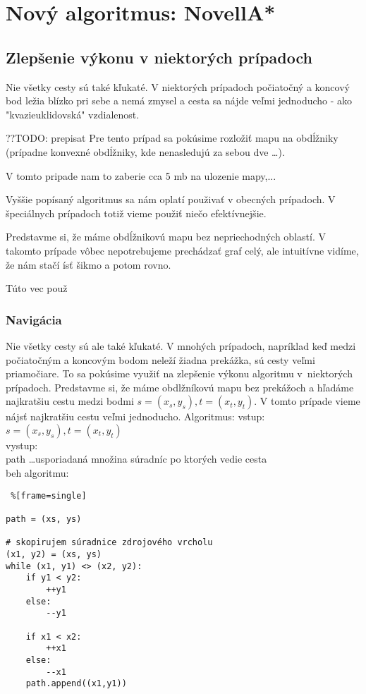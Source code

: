 \chapter{Nový algoritmus: NovellA*}

\section{Zlepšenie výkonu v niektorých prípadoch}
Nie všetky cesty sú také kľukaté. V niektorých prípadoch
počiatočný a koncový bod ležia blízko pri sebe a nemá zmysel a cesta sa nájde 
veľmi jednoducho - ako "kvazieuklidovská" vzdialenost.

??TODO: prepisat
Pre tento prípad sa pokúsime rozložiť mapu na obdĺžniky
(prípadne konvexné obdĺžniky, kde nenasledujú za sebou dve \dots).

V tomto pripade nam to zaberie cca 5 mb na ulozenie mapy,...


Vyššie popísaný algoritmus sa nám oplatí použivať v obecných prípadoch.
V špeciálnych prípadoch totiž vieme použiť niečo efektívnejšie.

Predstavme si, že máme obdĺžnikovú mapu bez nepriechodných oblastí. V takomto prípade vôbec nepotrebujeme
prechádzať graf 
celý, ale intuitívne vidíme, že nám stačí ísť šikmo a potom rovno.

Túto vec použ
\subsection{Navigácia}


Nie všetky cesty sú ale také kľukaté. V mnohých prípadoch, napríklad keď medzi počiatočným a koncovým bodom neleží žiadna prekážka, 
sú cesty veľmi priamočiare. To sa pokúsime využiť na zlepšenie výkonu algoritmu v~niektorých prípadoch. 
Predstavme si, že máme obdlžníkovú mapu bez prekážoch a hľadáme najkratšiu cestu medzi bodmi $s=(x_s,y_s), t=(x_t,y_t)$.
V tomto prípade vieme nájsť najkratšiu cestu veľmi jednoducho.
Algoritmus:
vstup: \\
$s=(x_s,y_s), t=(x_t,y_t)$ \\
vystup:\\
path \dots usporiadaná množina súradníc po ktorých vedie cesta\\
beh algoritmu:\\


\lstset{language=Python}          
\begin{lstlisting} %[frame=single]  

path = (xs, ys)

# skopirujem súradnice zdrojového vrcholu
(x1, y2) = (xs, ys) 
while (x1, y1) <> (x2, y2):
	if y1 < y2:
		++y1
	else:
		--y1

	if x1 < x2:
		++x1
	else:
		--x1
	path.append((x1,y1))
\end{lstlisting}

